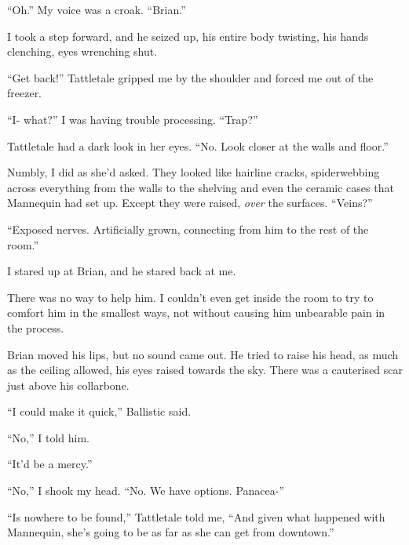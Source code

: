 ``Oh.''  My voice was a croak.  ``Brian.''



I took a step forward, and he seized up, his entire body twisting, his hands clenching, eyes wrenching shut.



``Get back!'' Tattletale gripped me by the shoulder and forced me out of the freezer.



``I- what?''  I was having trouble processing.  ``Trap?''



Tattletale had a dark look in her eyes.  ``No.  Look closer at the walls and floor.''



Numbly, I did as she'd asked.  They looked like hairline cracks, spiderwebbing across everything from the walls to the shelving and even the ceramic cases that Mannequin had set up.  Except they were raised, \emph{over} the surfaces.  ``Veins?''



``Exposed nerves.  Artificially grown, connecting from him to the rest of the room.''



I stared up at Brian, and he stared back at me.



There was no way to help him.  I couldn't even get inside the room to try to comfort him in the smallest ways, not without causing him unbearable pain in the process.



Brian moved his lips, but no sound came out.  He tried to raise his head, as much as the ceiling allowed, his eyes raised towards the sky.  There was a cauterised scar just above his collarbone.



``I could make it quick,'' Ballistic said.



``No,'' I told him.



``It'd be a mercy.''



``No,'' I shook my head.  ``No.  We have options.  Panacea-''



``Is nowhere to be found,'' Tattletale told me, ``And given what happened with Mannequin, she's going to be as far as she can get from downtown.''



